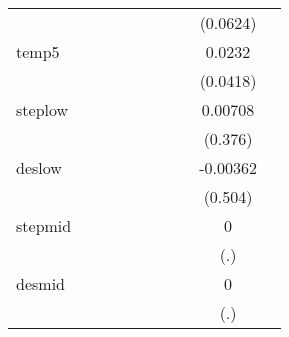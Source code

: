 {\begin{tabular}{l*{9}{c}}
            &                     &                     &                     &                     &                     &                     &                     &    (0.0624)         &                     \\
[1em]
temp5       &                     &                     &                     &                     &                     &                     &                     &      0.0232         &                     \\
            &                     &                     &                     &                     &                     &                     &                     &    (0.0418)         &                     \\
[1em]
steplow     &                     &                     &                     &                     &                     &                     &                     &     0.00708         &                     \\
            &                     &                     &                     &                     &                     &                     &                     &     (0.376)         &                     \\
[1em]
deslow      &                     &                     &                     &                     &                     &                     &                     &    -0.00362         &                     \\
            &                     &                     &                     &                     &                     &                     &                     &     (0.504)         &                     \\
[1em]
stepmid     &                     &                     &                     &                     &                     &                     &                     &           0         &                     \\
            &                     &                     &                     &                     &                     &                     &                     &         (.)         &                     \\
[1em]
desmid      &                     &                     &                     &                     &                     &                     &                     &           0         &                     \\
            &                     &                     &                     &                     &                     &                     &                     &         (.)         &                     \\

\end{tabular}}

